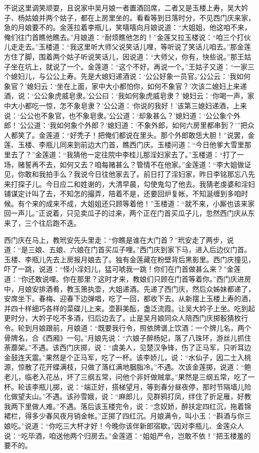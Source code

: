 不说这里调笑顽耍，且说家中吴月娘一者置酒回席，二者又是玉楼上寿，吴大妗子、杨姑娘并两个姑子，都在上房里坐的。看看等到日落时分，不见西门庆来家，急的月娘要不的。金莲拉着李瓶儿，笑嘻嘻向月娘说道：“大姐姐，他这咱不来，俺们往门首瞧他瞧去。”月娘道：“耐烦瞧他怎的！”金莲又拉玉楼说：“咱三个打伙儿走走去。”玉楼道：“我这里听大师父说笑话儿哩，等听说了笑话儿咱去。”那金莲方住了脚，围着两个姑子听说笑话儿，因说道：“大师父，你有，快些说。”那王姑子坐在坑上，就说了一个。金莲道：“这个不好。再说一个。”王姑子又道：“一家三个媳妇儿，与公公上寿。先是大媳妇递酒说：‘公公好象一员官。’公公云：‘我如何象官？’媳妇云：‘坐在上面，家中大小都怕你，如何不象官？’次该二媳妇上来递酒，说：‘公公象虎威皂隶。’公公曰：‘我如何象虎威皂隶？’媳妇云：‘你喝一声，家中大小都吃一惊，怎不象皂隶？’公公道：‘你说的我好！’该第三媳妇递酒，上来说：‘公公也不象官，也不象皂隶。’公公道：‘却象甚么？’媳妇道：‘公公象个外郎！’公公道：‘我如何象个外郎？’媳妇道：‘不象外郎，如何六房里都串到？’”把众人都笑了。金莲道：“好秃子！把俺们都说在里头。那个外郎敢恁大胆！”说罢，金莲、玉楼、李瓶儿同来到前边大门首，瞧西门庆。玉楼问道：“今日他爹大雪里那里去了？”金莲道：“我猜他一定往院中李桂儿那淫妇家去了。”玉楼道：“打了一场，赌誓再不去，如何又去？咱每赌甚么？管情不在他家。”金莲道：“李大姐做证见，你敢和我拍手么？我说今日往他家去了。前日打了淫妇家，昨日李铭那忘八先来打探子儿。今日应二和姓谢的，大清早晨，勾使鬼勾了他去。我猜老虔婆和淫妇铺谋定计叫了去，不知怎的撮弄，陪着不是，还要回炉复帐，不知涎缠到多咱时候。有个来的成来不成，大姐姐还只顾等着他！”玉楼道：“就不来，小厮也该来家回一声儿。”正说着，只见卖瓜子的过来，两个正在门首买瓜子儿，忽然西门庆从东来了，三个往后跑不迭。

西门庆在马上，教玳安先头里走：“你瞧是谁在大门首？”玳安走了两步，说道：“是三娘、五娘、六娘在门首买瓜子哩。”西门庆到家下马，进入后边仪门首。玉楼、李瓶儿先去上房报月娘去了。独有金莲藏在粉壁背后黑影里。西门庆撞见，吓了一跳，说道：“怪小淫妇儿，猛可唬我一跳！你们在门首做甚么来？”金莲道：“你还敢说哩。你在那里？这时才来，教娘们只顾在门首等着你。”西门庆进房中，月娘安排酒肴，教玉箫执壶，大姐递酒。先递了西门庆，然后众姊妹都递了，安席坐下。春梅、迎春下边弹唱，吃了一回，都收下去。从新摆上玉楼上寿的酒，并四十样细巧各样的菜碟儿上来。壶斟美酝，盏泛流霞。让吴大妗子上坐。吃到起更时分，大妗子吃不多酒，归后边去了。止是吴月娘同众人陪西门庆掷骰猜枚行令。轮到月娘跟前，月娘道：“既要我行令，照依牌谱上饮酒：一个牌儿名，两个骨牌名，合《西厢》一句。”月娘先说：“六娘子醉杨妃，落了八珠环，游丝儿抓住荼蘼架。”不遇。该西门庆掷，说：“虞美人，见楚汉争锋，伤了正马军，只听耳边金鼓连天震。”果然是个正马军，吃了一杯。该李娇儿，说：“水仙子，因二士入桃源，惊散了花开蝶满枝，只做了落红满地胭脂冷。”不遇。次该金莲掷，说道：“鲍老儿，临老入花丛，坏了三纲五常，问他个非奸做贼拿。”果然是三纲五常，吃了一杯。轮该李瓶儿掷，说：“端正好，搭梯望月，等到春分昼夜停，那时节隔墙儿险化做望夫山。”不遇。该孙雪娥，说：“麻郎儿，见群鸦打凤，绊住了折足雁，好教我两下里做人难。”不遇。落后该玉楼完令，说：“念奴娇，醉扶定四红沉，拖着锦裙栏，得多少春风夜月销金帐。”正掷了四红沉。月娘满令，叫小玉：“斟酒与你三娘吃。”说道：“你吃三大杯才好！今晚你该伴新郎宿歇。”因对李瓶儿、金莲众人说：“吃毕酒，咱送他两个归房去。”金莲道：“姐姐严令，岂敢不依！”把玉楼羞的要不的。

